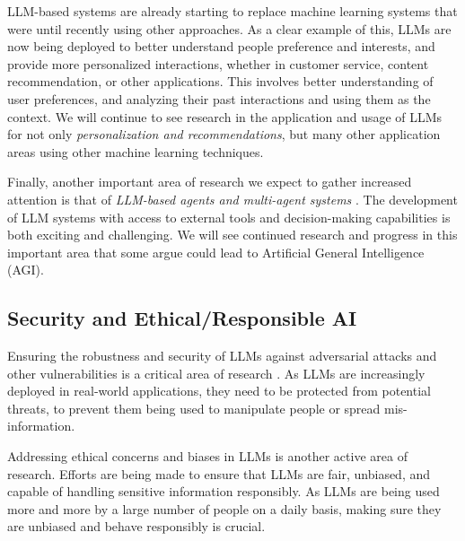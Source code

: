 \documentclass[conference]{IEEEtran}
\begin{document}
LLM-based systems are already starting to replace machine learning systems that were until recently using other approaches. As a clear example of this, LLMs are now being deployed to better understand people preference and interests, and provide more personalized interactions, whether in customer service, content recommendation, or other applications. This involves better understanding of user preferences, and analyzing their past interactions and using them as the context. We will continue to see research in the application and usage of LLMs for not only \emph{personalization and recommendations}, but many other application areas using other machine learning techniques.

Finally, another important area of research we expect to gather increased attention is that of \emph{LLM-based agents and multi-agent systems} \cite{xi2023rise,wang2023survey,durante2024agent}. The development of LLM systems with access to external tools and decision-making capabilities is both exciting and challenging. We will see continued research and progress in this important area that some argue could lead to Artificial General Intelligence (AGI).


\subsection{Security and Ethical/Responsible AI}

Ensuring the robustness and security of LLMs against adversarial attacks and other vulnerabilities is a critical area of research \cite{sun2024trustllm}. As LLMs are increasingly deployed in real-world applications, they need to be protected from potential threats, to prevent them being used to manipulate people or spread mis-information.

Addressing ethical concerns and biases in LLMs is another active area of research. Efforts are being made to ensure that LLMs are fair, unbiased, and capable of handling sensitive information responsibly. As LLMs are being used more and more by a large number of people on a daily basis, making sure they are unbiased and behave responsibly is crucial.
\end{document}
